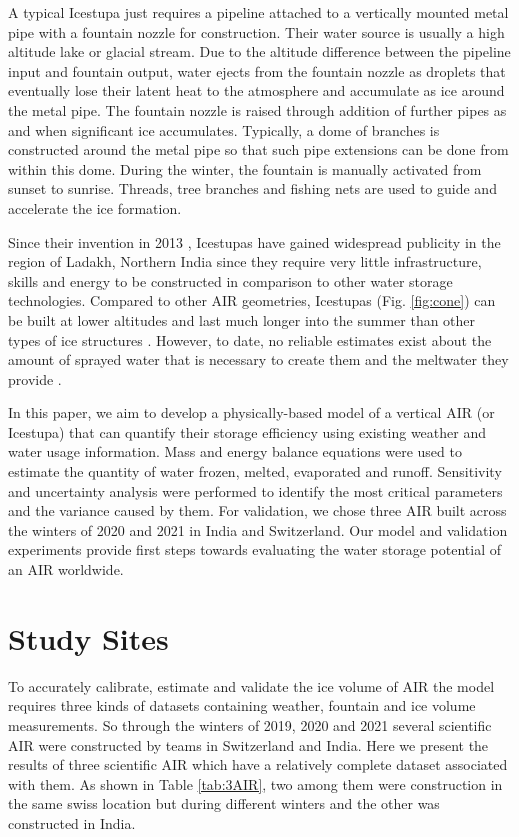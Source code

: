 \documentclass[utf8]{frontiersSCNS} %
\begin{document}
A typical Icestupa just requires a pipeline attached to a vertically mounted metal pipe with a fountain nozzle for
construction. Their water source is usually a high altitude lake or glacial stream. Due to the altitude difference
between the pipeline input and fountain output, water ejects from the fountain nozzle as droplets that eventually lose
their latent heat to the atmosphere and accumulate as ice around the metal pipe. The fountain nozzle is raised through
addition of further pipes as and when significant ice accumulates. Typically, a dome of branches is constructed around
the metal pipe so that such pipe extensions can be done from within this dome. During the winter, the fountain is
manually activated from sunset to sunrise. Threads, tree branches and fishing nets are used to guide and accelerate the
ice formation.

Since their invention in 2013 \citep{campaign}, Icestupas have gained widespread publicity in the region of Ladakh,
Northern India since they require very little infrastructure, skills and energy to be constructed in comparison to
other water storage technologies. Compared to other AIR geometries, Icestupas (Fig. \ref{fig:cone}) can be built at
lower altitudes and last much longer into the summer than other types of ice structures \citep{campaign}. However, to
date, no reliable estimates exist about the amount of sprayed water that is necessary to create them and the meltwater
they provide \citep{Nusser_2018}. 

In this paper, we aim to develop a physically-based model of a vertical AIR (or Icestupa) that can quantify their
storage efficiency using existing weather and water usage information. Mass and energy balance equations were used to
estimate the quantity of water frozen, melted, evaporated and runoff. Sensitivity and uncertainty analysis were
performed to identify the most critical parameters and the variance caused by them. For validation, we chose three AIR
built across the winters of 2020 and 2021 in India and Switzerland. Our model and validation experiments provide first
steps towards evaluating the water storage potential of an AIR worldwide. 

\section{Study Sites}
To accurately calibrate, estimate and validate the ice volume of AIR the model requires three kinds of datasets
containing weather, fountain and ice volume measurements. So through the winters of 2019, 2020 and 2021
several scientific AIR were constructed by teams in Switzerland and India. Here we present the results of three
scientific AIR which have a relatively complete dataset associated with them. As shown in Table \ref{tab:3AIR}, two
among them were construction in the same swiss location but during different winters and the other was constructed in
India.    
\end{document}

